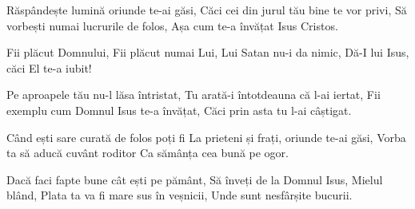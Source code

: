 \beginverse
Răspândește lumină oriunde te-ai găsi,
Căci cei din jurul tău bine te vor privi,
Să vorbești numai lucrurile de folos,
Așa cum te-a învățat Isus Cristos.
\endverse

\beginchorus
Fii plăcut Domnului,
Fii plăcut numai Lui,
Lui Satan nu-i da nimic,
Dă-I lui Isus, căci El te-a iubit!
\endchorus

\beginverse
Pe aproapele tău nu-l lăsa întristat,
Tu arată-i întotdeauna că l-ai iertat,
Fii exemplu cum Domnul Isus te-a învățat,
Căci prin asta tu l-ai câștigat.
\endverse

\beginverse
Când ești sare curată de folos poți fi
La prieteni și frați, oriunde te-ai găsi,
Vorba ta să aducă cuvânt roditor
Ca sămânța cea bună pe ogor.
\endverse

\beginverse
Dacă faci fapte bune cât ești pe pământ,
Să înveți de la Domnul Isus, Mielul blând,
Plata ta va fi mare sus în veșnicii,
Unde sunt nesfârșite bucurii.
\endverse
\endsong